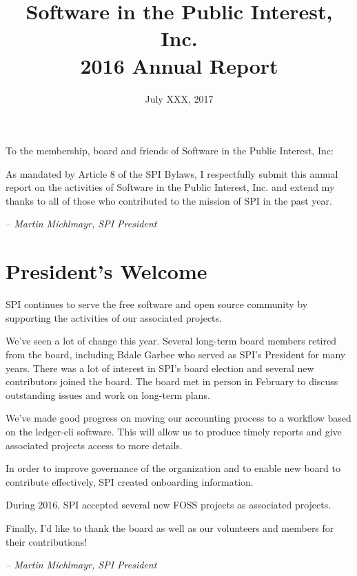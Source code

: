 \documentclass[letterpaper]{report}
\begin{document}
\title{Software in the Public Interest, Inc.\\
2016 Annual Report}
\date{July XXX, 2017}

\maketitle

To the membership, board and friends of Software in the Public Interest, Inc:

As mandated by Article 8 of the SPI Bylaws, I respectfully submit this annual
report on the activities of Software in the Public Interest, Inc. and extend my
thanks to all of those who contributed to the mission of SPI in the past year.

  \emph{-- Martin Michlmayr, SPI President}

\newpage

\tableofcontents

\newpage

\chapter{President's Welcome}
\label{sec:president}

SPI continues to serve the free software and open source community by
supporting the activities of our associated projects.

We've seen a lot of change this year.  Several long-term board members
retired from the board, including Bdale Garbee who served as SPI's
President for many years.  There was a lot of interest in SPI's board
election and several new contributors joined the board.  The board met
in person in February to discuss outstanding issues and work on
long-term plans.

We've made good progress on moving our accounting process to a workflow
based on the ledger-cli software.  This will allow us to produce timely
reports and give associated projects access to more details.

In order to improve governance of the organization and to enable new board
to contribute effectively, SPI created onboarding information.

During 2016, SPI accepted several new FOSS projects as associated
projects.

Finally, I'd like to thank the board as well as our volunteers and
members for their contributions!

  \emph{-- Martin Michlmayr, SPI President}
\end{document}
